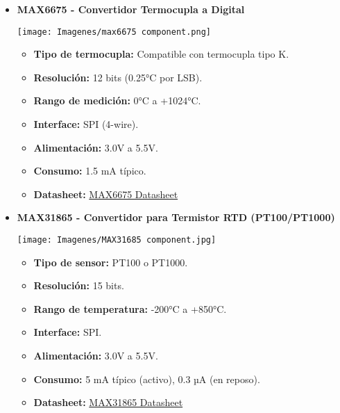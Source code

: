 \begin{itemize}
    \item \textbf{MAX6675 - Convertidor Termocupla a Digital} 
    \begin{center}
        \texttt{[image: Imagenes/max6675 component.png]}
    \end{center}
    \begin{itemize}
        \item \textbf{Tipo de termocupla:} Compatible con termocupla tipo K.
        \item \textbf{Resolución:} 12 bits (0.25°C por LSB).
        \item \textbf{Rango de medición:} 0°C a +1024°C.
        \item \textbf{Interface:} SPI (4-wire).
        \item \textbf{Alimentación:} 3.0V a 5.5V.
        \item \textbf{Consumo:} 1.5 mA típico.
        \item \textbf{Datasheet:} \href{https://datasheets.maximintegrated.com/en/ds/MAX6675.pdf}{MAX6675 Datasheet}
    \end{itemize}

    \item \textbf{MAX31865 - Convertidor para Termistor RTD (PT100/PT1000)} 
    \begin{center}
        \texttt{[image: Imagenes/MAX31685 component.jpg]}
    \end{center}
    \begin{itemize}
        \item \textbf{Tipo de sensor:} PT100 o PT1000.
        \item \textbf{Resolución:} 15 bits.
        \item \textbf{Rango de temperatura:} -200°C a +850°C.
        \item \textbf{Interface:} SPI.
        \item \textbf{Alimentación:} 3.0V a 5.5V.
        \item \textbf{Consumo:} 5 mA típico (activo), 0.3 µA (en reposo).
        \item \textbf{Datasheet:} \href{https://datasheets.maximintegrated.com/en/ds/MAX31865.pdf}{MAX31865 Datasheet}
    \end{itemize}


\end{itemize}
